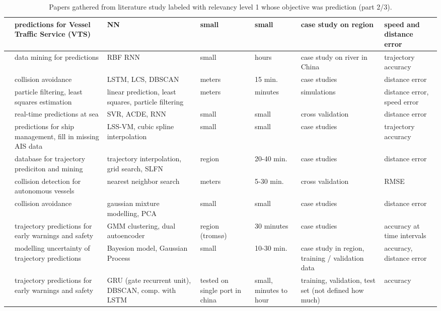 \noindent
\begin{table}[htbp]
{\small\begin{tabularx}{1.2\textwidth}{p{0.6in} X X X p{0.4in} X p{0.5in}}
    \midrule
    \cite{Kim2018PreprocessingArea} & predictions for Vessel Traffic Service (VTS) & NN & small & small & case study on region & speed and distance error \\ \midrule
    \cite{Li2018ShipMining} & data mining for predictions & RBF RNN & small & hours & case study on river in China & trajectory accuracy \\ \midrule
    \cite{Li2019Long-termData} & collision avoidance & LSTM, LCS, DBSCAN & meters & 15 min. & case studies & distance error \\ \midrule
    \cite{Lian2019ResearchAlgorithm} & particle filtering, least squares estimation & linear prediction, least squares, particle filtering & meters & minutes & simulations & distance error, speed error \\ \midrule
    \cite{Liu2019VesselACDE-SVR} & real-time predictions at sea & SVR, ACDE, RNN & small & small & cross validation & distance error \\ \midrule
    \cite{Liu2020PredictingLearning} & predictions for ship management, fill in missing AIS data & LSS-VM, cubic spline interpolation & small & small & case studies & trajectory accuracy \\ \midrule
    \cite{Mao2018AnMining} & database for trajectory prediciton and mining & trajectory interpolation, grid search, SLFN & region & 20-40 min. & case studies & distance error \\ \midrule
    \cite{Murray2018AOperations} & collision detection for autonomous vessels & nearest neighbor search & meters & 5-30 min. & cross validation & RMSE \\ \midrule
    \cite{Murray2019AnVessels} & collision avoidance & gaussian mixture modelling, PCA & small & small & case studies & distance error \\ \midrule
    \cite{Murray2020AData} & trajectory predictions for early warnings and safety & GMM clustering, dual autoencoder & region (tromsø) & 30 minutes & case studies & accuracy at time intervals \\ \midrule
    \cite{Rong2019ShipModel} & modelling uncertainty of trajectory predictions & Bayesion model, Gaussian Process & small & 10-30 min. & case study in region, training / validation data & accuracy, distance error \\ \midrule
    \cite{Suo2020ANetwork} & trajectory predictions for early warnings and safety & GRU (gate recurrent unit), DBSCAN, comp. with LSTM & tested on single port in china & small, minutes to hour & training, validation, test set (not defined how much) & accuracy \\ \midrule
\end{tabularx}}
\caption{Papers gathered from literature study labeled with relevancy level 1 whose objective was prediction (part 2/3).}
\label{tab:lit_review_cat_1_2}
\end{table}

